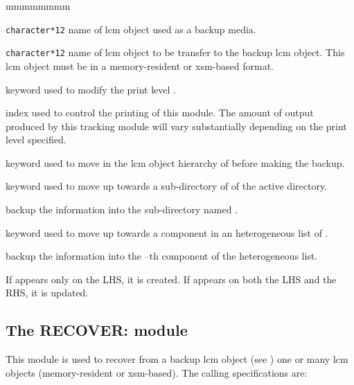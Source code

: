 \begin{ListeDeDescription}{mmmmmmmm}

\item[\dusa{NAME1}] {\tt character*12} name of {\sc lcm} object used as a
backup media.

\item[\dusa{NAME2}] {\tt character*12} name of {\sc lcm} object
to be transfer to the backup {\sc lcm} object. This {\sc lcm} object must be in a
memory-resident or {\sc xsm}-based format.

\item[\moc{EDIT}] keyword used to modify the print level .

\item[\dusa{iprint}] index used to control the printing of this module. The
amount of output produced by this tracking module will vary substantially
depending on the print level specified.

\item[\moc{STEP}] keyword used to move in the {\sc lcm} object hierarchy of  before making the backup.

\item[\moc{UP}] keyword used to move up towards a sub-directory of  of the
active directory.

\item[\dusa{NOMDIR}] backup the information into the sub-directory named .

\item[\moc{AT}] keyword used to move up towards a component in an heterogeneous list of .

\item[\dusa{index}] backup the information into the --th component of the heterogeneous list.

\end{ListeDeDescription}

If  appears only on the LHS, it is created. If 
appears on both the LHS and the RHS, it is updated.

\clearpage

\subsection{The RECOVER: module}\label{sect:RECOVERData}

This module is used to recover from a backup {\sc lcm} object (see
) one or many {\sc lcm} objects (memory-resident or {\sc xsm}-based).
The calling specifications are:


